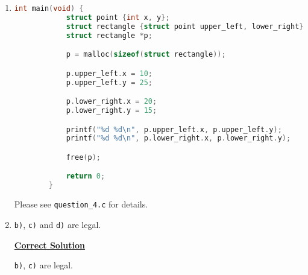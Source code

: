 \documentclass[12pt]{article}
\begin{document}
\begin{enumerate}[1.]
    \item


    \begin{lstlisting}[language=c]
        int main(void) {
            struct point {int x, y};
            struct rectangle {struct point upper_left, lower_right};
            struct rectangle *p;

            p = malloc(sizeof(struct rectangle));

            p.upper_left.x = 10;
            p.upper_left.y = 25;

            p.lower_right.x = 20;
            p.lower_right.y = 15;

            printf("%d %d\n", p.upper_left.x, p.upper_left.y);
            printf("%d %d\n", p.lower_right.x, p.lower_right.y);

            free(p);

            return 0;
        }

    \end{lstlisting}


    Please see \texttt{question\_4.c} for details.

    \item

    \texttt{b)}, \texttt{c)} and \texttt{d)} are legal.

    \bigskip

    \begin{mdframed}
    \underline{\textbf{Correct Solution}}

    \bigskip

    \texttt{b)}, \texttt{c)} are legal.
    \end{mdframed}


\end{enumerate}
\end{document}

